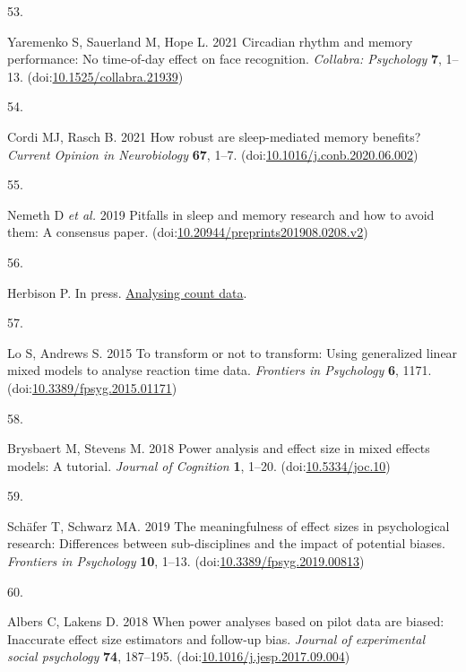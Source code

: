 \documentclass[
]{article}
\newlength{\cslhangindent}
\newlength{\csllabelwidth}
\newlength{\cslentryspacingunit} %
\newenvironment{CSLReferences}[2] %
 {%
  \setlength{\parindent}{0pt}
  \ifodd #1
  \let\oldpar\par
  \def\par{\hangindent=\cslhangindent\oldpar}
  \fi
  \setlength{\parskip}{#2\cslentryspacingunit}
 }%
 {}
\newcommand{\CSLLeftMargin}[1]{\parbox[t]{\csllabelwidth}{#1}}
\newcommand{\CSLRightInline}[1]{\parbox[t]{\linewidth - \csllabelwidth}{#1}\break}
\begin{document}
\begin{CSLReferences}{0}{0}
\leavevmode{}%
\CSLLeftMargin{53. }%
\CSLRightInline{Yaremenko S, Sauerland M, Hope L. 2021 Circadian rhythm and memory performance: No time-of-day effect on face recognition. \emph{Collabra: Psychology} \textbf{7}, 1--13. (doi:\href{https://doi.org/10.1525/collabra.21939}{10.1525/collabra.21939})}

\leavevmode{}%
\CSLLeftMargin{54. }%
\CSLRightInline{Cordi MJ, Rasch B. 2021 How robust are sleep-mediated memory benefits? \emph{Current Opinion in Neurobiology} \textbf{67}, 1--7. (doi:\href{https://doi.org/10.1016/j.conb.2020.06.002}{10.1016/j.conb.2020.06.002})}

\leavevmode{}%
\CSLLeftMargin{55. }%
\CSLRightInline{Nemeth D \emph{et al.} 2019 Pitfalls in sleep and memory research and how to avoid them: A consensus paper. (doi:\href{https://doi.org/10.20944/preprints201908.0208.v2}{10.20944/preprints201908.0208.v2})}

\leavevmode{}%
\CSLLeftMargin{56. }%
\CSLRightInline{Herbison P. In press. \href{https://www.ics.org/Abstracts/Publish/44/000161.pdf}{Analysing count data}. }

\leavevmode{}%
\CSLLeftMargin{57. }%
\CSLRightInline{Lo S, Andrews S. 2015 To transform or not to transform: Using generalized linear mixed models to analyse reaction time data. \emph{Frontiers in Psychology} \textbf{6}, 1171. (doi:\href{https://doi.org/10.3389/fpsyg.2015.01171}{10.3389/fpsyg.2015.01171})}

\leavevmode{}%
\CSLLeftMargin{58. }%
\CSLRightInline{Brysbaert M, Stevens M. 2018 Power analysis and effect size in mixed effects models: A tutorial. \emph{Journal of Cognition} \textbf{1}, 1--20. (doi:\href{https://doi.org/10.5334/joc.10}{10.5334/joc.10})}

\leavevmode{}%
\CSLLeftMargin{59. }%
\CSLRightInline{Schäfer T, Schwarz MA. 2019 The meaningfulness of effect sizes in psychological research: Differences between sub-disciplines and the impact of potential biases. \emph{Frontiers in Psychology} \textbf{10}, 1--13. (doi:\href{https://doi.org/10.3389/fpsyg.2019.00813}{10.3389/fpsyg.2019.00813})}

\leavevmode{}%
\CSLLeftMargin{60. }%
\CSLRightInline{Albers C, Lakens D. 2018 When power analyses based on pilot data are biased: Inaccurate effect size estimators and follow-up bias. \emph{Journal of experimental social psychology} \textbf{74}, 187--195. (doi:\href{https://doi.org/10.1016/j.jesp.2017.09.004}{10.1016/j.jesp.2017.09.004})}


\end{CSLReferences}
\end{document}
